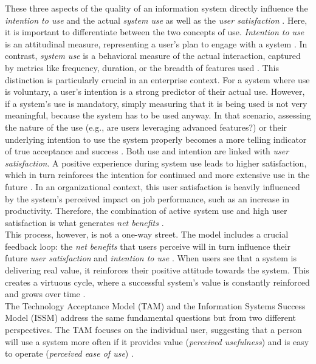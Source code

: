 \documentclass[
	english,
	ruledheaders=section,%
	class=report,%
	thesis={type=bachelor},%
	accentcolor=1b,%
	custommargins=true,%
	marginpar=false,%
	parskip=half-,%
	fontsize=11pt,%
	DIV=14,
]{tudapub}
\begin{document}
These three aspects of the quality of an information system directly influence the \textit{intention to use} and the actual \textit{system use} as well as the \textit{user satisfaction} \parencite[p.~23]{DeloneMcLean2003ISSuccessTenYearUpdate}. Here, it is important to differentiate between the two concepts of use. \textit{Intention to use} is an attitudinal measure, representing a user's plan to engage with a system \parencite[p.~23]{DeloneMcLean2003ISSuccessTenYearUpdate}. In contrast, \textit{system use} is a behavioral measure of the actual interaction, captured by metrics like frequency, duration, or the breadth of features used \parencite[p.~66]{DeloneMcLean1992ISSuccess}. This distinction is particularly crucial in an enterprise context. For a system where use is voluntary, a user's intention is a strong predictor of their actual use. However, if a system's use is mandatory, simply measuring that it is being used is not very meaningful, because the system has to be used anyway. In that scenario, assessing the nature of the use (e.g., are users leveraging advanced features?) or their underlying intention to use the system properly becomes a more telling indicator of true acceptance and success
\parencite[p.~66]{DeloneMcLean1992ISSuccess}. Both use and intention are linked with \textit{user satisfaction}. A positive experience during system use leads to higher satisfaction, which in turn reinforces the intention for continued and more extensive use in the future \parencite[p.~87]{DeloneMcLean1992ISSuccess}. In an organizational context, this user satisfaction is heavily influenced by the system's perceived impact on job performance, such as an increase in productivity. Therefore, the combination of active system use and high user satisfaction is what generates \textit{net benefits} \parencite[p.~23]{DeloneMcLean2003ISSuccessTenYearUpdate}.\\
This process, however, is not a one-way street. The model includes a crucial feedback loop: the \textit{net benefits} that users perceive will in turn influence their future \textit{user satisfaction} and \textit{intention to use} \parencite[p.~23-24]{DeloneMcLean2003ISSuccessTenYearUpdate}. When users see that a system is delivering real value, it reinforces their positive attitude towards the system. This creates a virtuous cycle, where a successful system's value is constantly reinforced and grows over time \parencite[p.~23]{DeloneMcLean2003ISSuccessTenYearUpdate}.\\
The Technology Acceptance Model (TAM) and the Information Systems Success Model (ISSM) address the same fundamental questions but from two different perspectives. The TAM focuses on the individual user, suggesting that a person will use a system more often if it provides value (\textit{perceived usefulness}) and is easy to operate (\textit{perceived ease of use}) \parencite[p.~320]{Davis1989}.
\end{document}
